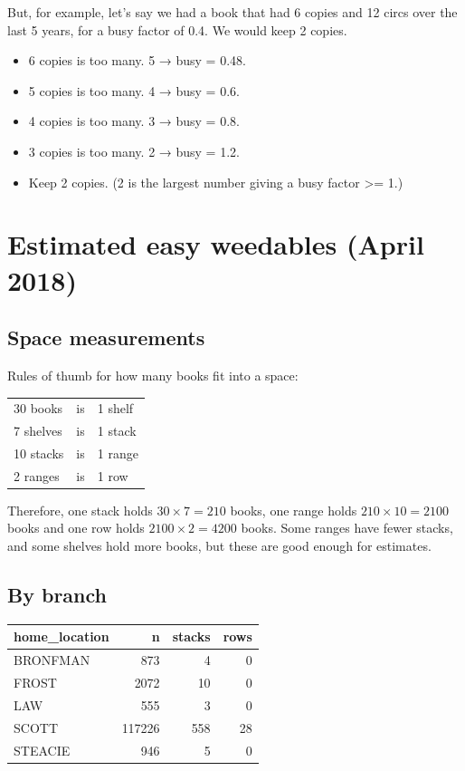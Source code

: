 \documentclass[11pt]{article}
\begin{document}
But, for example, let's say we had a book that had 6 copies and 12 circs over the last 5 years, for a busy factor of 0.4.  We would keep 2 copies.

\begin{itemize}
\item 6 copies is too many.  5 → busy = 0.48.
\item 5 copies is too many.  4 → busy = 0.6.
\item 4 copies is too many.  3 → busy = 0.8.
\item 3 copies is too many.  2 → busy = 1.2.
\item Keep 2 copies.  (2 is the largest number giving a busy factor >= 1.)
\end{itemize}

\section*{Estimated easy weedables (April 2018)}
\label{sec:orga991bc7}

\subsection*{Space measurements}
\label{sec:orged14aeb}

Rules of thumb for how many books fit into a space:

\begin{center}
\begin{tabular}{lll}
30 books & is & 1  shelf\\
7 shelves & is & 1 stack\\
10 stacks & is & 1 range\\
2 ranges & is & 1 row\\
\end{tabular}
\end{center}

Therefore, one stack holds \(30 \times 7 = 210\) books, one range holds \(210 \times 10 = 2100\) books and one row holds \(2100 \times 2 = 4200\) books.  Some ranges have fewer stacks, and some shelves hold more books, but these are good enough for estimates.

\subsection*{By branch}
\label{sec:orgbff9867}

\begin{center}
\begin{tabular}{lrrr}
home\_location & n & stacks & rows\\
\hline
BRONFMAN & 873 & 4 & 0\\
FROST & 2072 & 10 & 0\\
LAW & 555 & 3 & 0\\
SCOTT & 117226 & 558 & 28\\
STEACIE & 946 & 5 & 0\\
\end{tabular}
\end{center}
\end{document}
